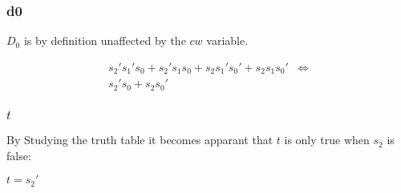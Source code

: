 \subsubsection{d0}
$D_{0}$ is by definition unaffected by the $cw$ variable. 

\begin{eqnarray*}
s_{2}'s_{1}'s_{0} + s_{2}'s_{1}s_{0} + s_{2}s_{1}'s_{0}' + s_{2}s_{1}s_{0}' & \Leftrightarrow\\
s_{2}'s_{0}+s_{2}s_{0}'
\end{eqnarray*}



\subsubsection{$t$}

By Studying the truth table it becomes apparant that $t$ is only
true when $s_{2}$ is false:

\begin{center}
$t = s_{2}'$
\par\end{center}